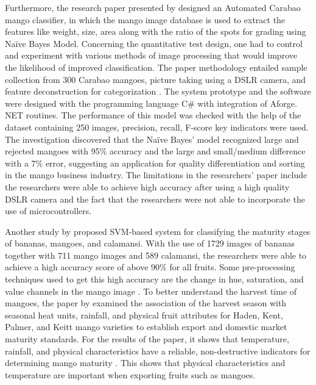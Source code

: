 Furthermore, the research paper presented by \citet{guillergan-naive-2024} designed an
Automated Carabao mango classifier, in which the mango image database is used to
extract the features like weight, size, area along with the ratio of the spots for grading
using Naïve Bayes Model. Concerning the quantitative test design, one had to control
and experiment with various methods of image processing that would improve the
likelihood of improved classification. The paper methodology entailed sample collection
from 300 Carabao mangoes, picture taking using a DSLR camera, and feature
deconstruction for categorization \citep{guillergan-naive-2024}. The system prototype and
the software were designed with the programming language C\# with integration of
Aforge. NET routines. The performance of this model was checked with the help of the
dataset containing 250 images, precision, recall, F-score key indicators were used. The
investigation discovered that the Naïve Bayes’ model recognized large and rejected
mangoes with 95\% accuracy and the large and small/medium difference with a 7\% error,
suggesting an application for quality differentiation and sorting in the mango business
industry. The limitations in the researchers’ paper include the researchers were able to
achieve high accuracy after using a high quality DSLR camera and the fact that the
researchers were not able to incorporate the use of microcontrollers.

Another study by \citet{tomas-detection-2022} proposed SVM-based system for classifying the maturity stages of bananas, mangoes, and calamansi. With the use of 1729 images of bananas together with 711 mango images and 589 calamansi, the researchers were able to achieve a high accuracy score of above 90\% for all fruits. Some pre-processing techniques used to get this high accuracy are the change in hue, saturation, and value channels in the mango image \citep{tomas-detection-2022}. To better understand the harvest time of mangoes, the paper by \citet{abu-determination-2021} examined the association of the harvest season with seasonal heat units, rainfall, and physical fruit attributes for Haden, Kent, Palmer, and Keitt mango varieties to establish export and domestic market maturity standards. For the results of the paper, it shows that temperature, rainfall, and physical characteristics have a reliable, non-destructive indicators for determining mango maturity \citep{abu-determination-2021}. This shows that physical characteristics and temperature are important when exporting fruits such as mangoes.


